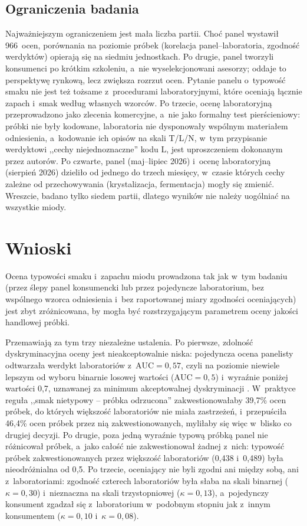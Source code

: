 \subsection{Ograniczenia badania}
\label{sub:ograniczenia}

Najważniejszym ograniczeniem jest mała liczba partii. Choć panel wystawił
966~ocen, porównania na poziomie próbek (korelacja panel--laboratoria,
zgodność werdyktów) opierają się na siedmiu jednostkach. Po drugie, panel tworzyli
konsumenci po krótkim szkoleniu, a~nie wyselekcjonowani asesorzy; oddaje
to perspektywę rynkową, lecz zwiększa rozrzut ocen. Pytanie panelu
o~typowość smaku nie jest też tożsame z~procedurami laboratoryjnymi, które
oceniają łącznie zapach i~smak według własnych wzorców. Po trzecie, ocenę
laboratoryjną przeprowadzono jako zlecenia komercyjne, a~nie jako formalny
test pierścieniowy: próbki nie były kodowane, laboratoria nie dysponowały
wspólnym materiałem odniesienia, a~kodowanie ich opisów na skali T/L/N,
w~tym przypisanie werdyktowi ,,cechy niejednoznaczne'' kodu L, jest
uproszczeniem dokonanym przez autorów. Po czwarte, panel (maj--lipiec 2026)
i~ocenę laboratoryjną (sierpień 2026) dzieliło od jednego do trzech miesięcy,
w~czasie których cechy zależne od przechowywania (krystalizacja, fermentacja) mogły
się zmienić. Wreszcie, badano tylko siedem partii, dlatego wyników nie należy
uogólniać na wszystkie miody.

\section{Wnioski}

Ocena typowości smaku i~zapachu miodu prowadzona tak jak w~tym
badaniu (przez ślepy panel konsumencki lub przez pojedyncze
laboratorium, bez wspólnego wzorca odniesienia i~bez raportowanej miary
zgodności oceniających) jest zbyt zróżnicowana, by mogła być
rozstrzygającym parametrem oceny jakości handlowej próbki.

Przemawiają za tym trzy niezależne ustalenia. Po pierwsze, zdolność
dyskryminacyjna oceny jest nieakceptowalnie niska: pojedyncza ocena
panelisty odtwarzała werdykt laboratoriów z~$\mathrm{AUC} = 0{,}57$, czyli
na poziomie niewiele lepszym od wyboru binarnie losowej wartości ($\mathrm{AUC} = 0{,}5$)
i~wyraźnie poniżej wartości 0{,}7, uznawanej za minimum akceptowalnej
dyskryminacji \cite{Hosmer2013}. W~praktyce reguła ,,smak nietypowy --
próbka odrzucona'' zakwestionowałaby 39{,}7\% ocen próbek, do których
większość laboratoriów nie miała zastrzeżeń, i~przepuściła 46{,}4\% ocen
próbek przez nią zakwestionowanych, myliłaby się więc w~blisko co drugiej
decyzji. Po drugie, poza jedną wyraźnie typową próbką panel nie różnicował
próbek, a~jako całość nie zakwestionował żadnej z~nich: typowość próbek
zakwestionowanych przez większość laboratoriów (0{,}438 i~0{,}489) była
nieodróżnialna od 0{,}5. Po trzecie, oceniający nie byli zgodni ani między
sobą, ani z~laboratoriami: zgodność czterech laboratoriów była słaba na
skali binarnej ($\kappa = 0{,}30$) i~nieznaczna na skali trzystopniowej
($\kappa = 0{,}13$), a~pojedynczy konsument zgadzał się z~laboratorium
w~podobnym stopniu jak z~innym konsumentem ($\kappa = 0{,}10$
i~$\kappa = 0{,}08$).

